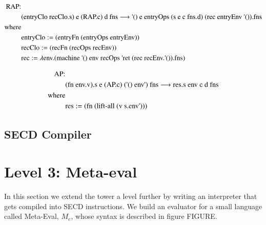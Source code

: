 \documentclass[fleqn]{article}
\theoremstyle{definition}
\newcommand{\ts}{\textquotesingle}
\newcommand{\mevl}{$M_{e}$}
\begin{document}
\begin{align*}
		\text{RAP:} & \\
		& \text{(entryClo recClo.s) e (RAP.c) d fns} \longrightarrow \text{{\ts}() e entryOps (s e c fns.d) (rec entryEnv {\ts}()).fns} \\
		\text{where}																																										\\
		& \text{entryClo} :=  \text{(entryFn (entryOps entryEnv))}																				\\
		& \text{recClo}	  :=  \text{(recFn (recOps recEnv))}																							\\
		& \text{rec}			:=  \text{$\lambda$env.(machine {\ts}() env recOps {\ts}ret (rec recEnv.{\ts}()).fns)}
\end{align*}

\begin{align*}
		\text{AP:} & \\
		& \text{(fn env.v).s e (AP.c) ({\ts}() env{\ts}) fns} \longrightarrow \text{res.s env c d fns}	\\
		\text{where}																																								\\
		& \text{res} 			:=  \text{(fn (lift-all (v s.env{\ts})))}
\end{align*}

\subsection{SECD Compiler}

\section{Level 3: Meta-eval}
In this section we extend the tower a level further by writing an interpreter that gets compiled into SECD instructions. We build an evaluator for a small language called Meta-Eval, \mevl, whose syntax is described in figure FIGURE.
\end{document}

